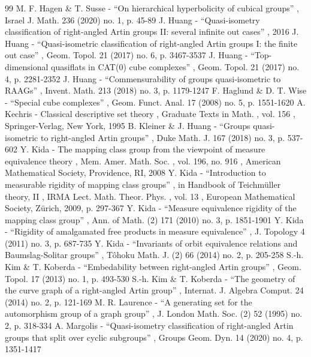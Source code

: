 \documentclass[11pt]{article}
\numberwithin{equation}{section}
\theoremstyle{plain}
\theoremstyle{definition}
\begin{document}
\begin{thebibliography}{99}
 M. F. Hagen \& T. Susse - “On hierarchical hyperbolicity of cubical groups” , Israel J. Math. 236 (2020) no. 1, p. 45-89
 J. Huang - “Quasi-isometry classification of right-angled Artin groups II: several infinite out cases” , 2016
 J. Huang - “Quasi-isometric classification of right-angled Artin groups I: the finite out case” , Geom. Topol. 21 (2017) no. 6, p. 3467-3537
 J. Huang - “Top-dimensional quasiflats in CAT(0) cube complexes” , Geom. Topol. 21 (2017) no. 4, p. 2281-2352
 J. Huang - “Commensurability of groups quasi-isometric to RAAGs” , Invent. Math. 213 (2018) no. 3, p. 1179-1247
 F. Haglund \& D. T. Wise - “Special cube complexes” , Geom. Funct. Anal. 17 (2008) no. 5, p. 1551-1620
 A. Kechris - Classical descriptive set theory , Graduate Texts in Math. , vol. 156 , Springer-Verlag, New York, 1995
 B. Kleiner \& J. Huang - “Groups quasi-isometric to right-angled Artin groups” , Duke Math. J. 167 (2018) no. 3, p. 537-602
 Y. Kida - The mapping class group from the viewpoint of measure equivalence theory , Mem. Amer. Math. Soc. , vol. 196, no. 916 , American Mathematical Society, Providence, RI, 2008
 Y. Kida - “Introduction to measurable rigidity of mapping class groups” , in Handbook of Teichmüller theory, II , IRMA Lect. Math. Theor. Phys. , vol. 13 , European Mathematical Society, Zürich, 2009, p. 297-367
 Y. Kida - “Measure equivalence rigidity of the mapping class group” , Ann. of Math. (2) 171 (2010) no. 3, p. 1851-1901
 Y. Kida - “Rigidity of amalgamated free products in measure equivalence” , J. Topology 4 (2011) no. 3, p. 687-735
 Y. Kida - “Invariants of orbit equivalence relations and Baumslag-Solitar groups” , Tôhoku Math. J. (2) 66 (2014) no. 2, p. 205-258
 S.-h. Kim \& T. Koberda - “Embedability between right-angled Artin groups” , Geom. Topol. 17 (2013) no. 1, p. 493-530
 S.-h. Kim \& T. Koberda - “The geometry of the curve graph of a right-angled Artin group” , Internat. J. Algebra Comput. 24 (2014) no. 2, p. 121-169
 M. R. Laurence - “A generating set for the automorphism group of a graph group” , J. London Math. Soc. (2) 52 (1995) no. 2, p. 318-334
 A. Margolis - “Quasi-isometry classification of right-angled Artin groups that split over cyclic subgroups” , Groups Geom. Dyn. 14 (2020) no. 4, p. 1351-1417

\end{thebibliography}
\end{document}
